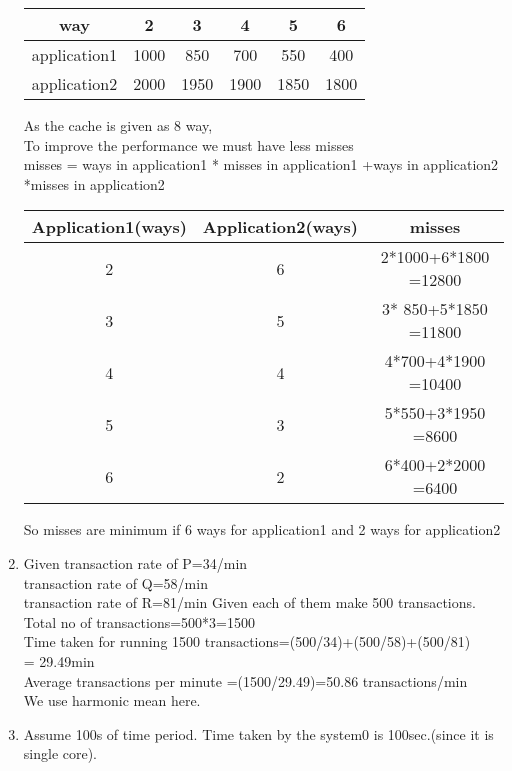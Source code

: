 \documentclass[12pt]{article}
\begin{document}
\begin{enumerate}
	
	\begin{center}
		\begin{tabular}{ |c|c|c|c|c|c| } 
			\hline
			way & 2 & 3 & 4 & 5 & 6 \\ 
			\hline
			application1  & 1000 & 850 &700 & 550 & 400 \\ 
			application2 & 2000 & 1950 & 1900 & 1850 & 1800 \\ 
			\hline
		\end{tabular}
	\end{center}
	As the cache is given as 8 way,\\
	To improve the performance we must have less misses \\
	misses =  ways in application1 * misses in application1 +ways in application2 *misses in application2 
	
	
	\begin{center}
		\begin{tabular}{ |c|c|c| } 
			\hline
			Application1(ways) & Application2(ways) & misses \\ 
			\hline
			2 & 6 & 2*1000+6*1800 =12800\\ 
			3 & 5 & 3* 850+5*1850 =11800\\ 
			4 & 4 & 4*700+4*1900 =10400\\
			5 & 3 & 5*550+3*1950 =8600\\
			6 & 2 & 6*400+2*2000 =6400 \\
			\hline
		\end{tabular}
	\end{center}
	So misses are minimum if 6 ways for application1 and 2 ways for application2\\
\item Given transaction rate of P=34/min\\
transaction rate of Q=58/min\\
transaction rate of R=81/min
Given each of them make 500 transactions. \\
Total no of transactions=500*3=1500\\
Time taken for running 1500 transactions=(500/34)+(500/58)+(500/81)\\
= 29.49min\\
Average transactions per minute =(1500/29.49)=50.86 transactions/min\\
We use harmonic mean here.\\
\item 
Assume 100s of time period. 
Time taken by the system0 is 100sec.(since it is single core).\\

\end{enumerate}
\end{document}
